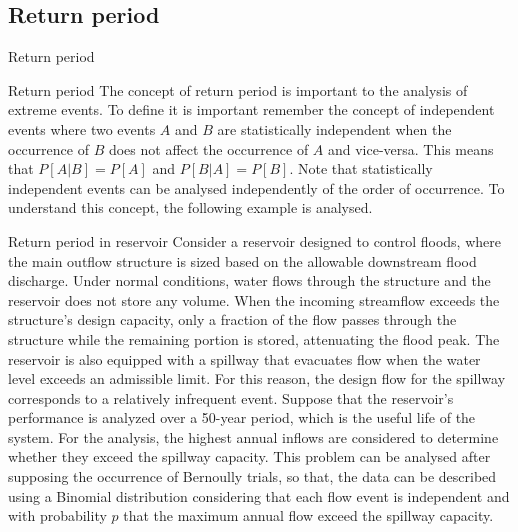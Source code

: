 \documentclass[8pt]{beamer}
\renewcommand{\emph}[1]{\textcolor{myorange}{#1}}
\begin{document}
\subsection{Return period}
\begin{frame}{Return period}
    \begin{block}{Return period}
        The concept of \alert{return period}  is important to the \emph{analysis of extreme events}. To define it is important remember the concept of \emph{independent events} where two events $A$ and $B$ are statistically independent when the occurrence of $B$ does not affect the occurrence of $A$ and vice-versa. This means that $P[A | B] = P[A]$ and $P[B | A] = P[B]$. Note that \emph{statistically independent events} can be analysed independently of the order of occurrence. 
        To understand this concept, the following example is analysed. 
 \begin{exampleblock}{Return period in reservoir} %
     Consider a reservoir designed to control floods, where the main outflow structure is sized based on the allowable downstream flood discharge. Under normal conditions, water flows through the structure and the reservoir does not store any volume. When the incoming streamflow exceeds the structure’s design capacity, only a fraction of the flow passes through the structure while the remaining portion is stored, attenuating the flood peak. The reservoir is also equipped with a spillway that evacuates flow when the water level exceeds an admissible limit. For this reason, the design flow for the spillway corresponds to a relatively infrequent event. Suppose that the reservoir’s performance is analyzed over a 50-year period, which is the useful life of the system. For the analysis, the highest annual inflows are considered to determine whether they exceed the spillway capacity. This problem can be analysed after supposing the occurrence of \emph{Bernoully trials}, so that, the data can be described using a \emph{Binomial distribution} considering that each flow event is independent and with probability $p$ that the maximum annual flow exceed the spillway capacity.  
 \end{exampleblock}
 
    \end{block}
\end{frame}
\end{document}
